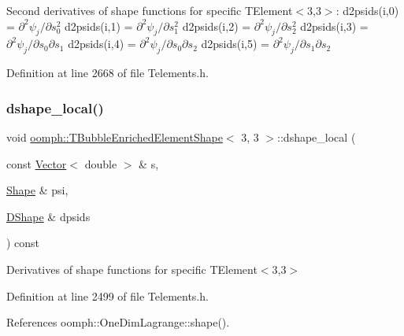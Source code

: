 Second derivatives of shape functions for specific T\+Element$<$3,3$>$\+: d2psids(i,0) = $ \partial^2 \psi_j / \partial s_0^2 $ d2psids(i,1) = $ \partial^2 \psi_j / \partial s_1^2 $ d2psids(i,2) = $ \partial^2 \psi_j / \partial s_2^2 $ d2psids(i,3) = $ \partial^2 \psi_j / \partial s_0 \partial s_1 $ d2psids(i,4) = $ \partial^2 \psi_j / \partial s_0 \partial s_2 $ d2psids(i,5) = $ \partial^2 \psi_j / \partial s_1 \partial s_2 $ 

Definition at line 2668 of file Telements.\+h.

\mbox{\label{classoomph_1_1TBubbleEnrichedElementShape_3_013_00_013_01_4_aac68cab20840e2bfee3af7a23d59dcb0}} 
\subsubsection{\texorpdfstring{dshape\+\_\+local()}{dshape\_local()}}
{\footnotesize\ttfamily void \hyperlink{classoomph_1_1TBubbleEnrichedElementShape}{oomph\+::\+T\+Bubble\+Enriched\+Element\+Shape}$<$ 3, 3 $>$\+::dshape\+\_\+local (\begin{DoxyParamCaption}\item[{const \hyperlink{classoomph_1_1Vector}{Vector}$<$ double $>$ \&}]{s,  }\item[{\hyperlink{classoomph_1_1Shape}{Shape} \&}]{psi,  }\item[{\hyperlink{classoomph_1_1DShape}{D\+Shape} \&}]{dpsids }\end{DoxyParamCaption}) const\hspace{0.3cm}{\ttfamily [inline]}}



Derivatives of shape functions for specific T\+Element$<$3,3$>$ 



Definition at line 2499 of file Telements.\+h.



References oomph\+::\+One\+Dim\+Lagrange\+::shape().

\mbox{\label{classoomph_1_1TBubbleEnrichedElementShape_3_013_00_013_01_4_a19e1c62b5fb4e91c8b5808a522e0110c}} 
